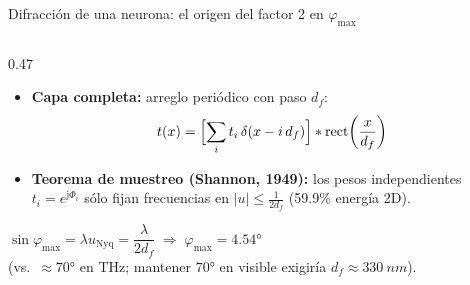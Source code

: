 \documentclass[aspectratio=169,10pt]{beamer}
\newcommand{\jj}{\mathrm{j}}
\newcommand{\rect}{\operatorname{rect}}
\begin{document}
\begin{frame}{Difracción de una neurona: el origen del factor 2 en $\varphi_{\max}$}
\begin{columns}[T,onlytextwidth]
\begin{column}{0.47\textwidth}
\begin{itemize}
      \item \textbf{Capa completa:} arreglo periódico con paso $d_f$:
      \[
        t(x)=\Bigl[\sum_i t_i\,\delta(x-i\,d_f)\Bigr]*\rect\!\left(\frac{x}{d_f}\right)
      \]
      \item \textbf{Teorema de muestreo (Shannon, 1949):} los pesos independientes $t_i=e^{\jj\Phi_i}$ sólo fijan frecuencias en $|u|\le \frac{1}{2d_f}$ (59.9\% energía 2D).
    \end{itemize}
    \vspace{2pt}
    \begin{destacado}
      \centering\footnotesize
      $\sin\varphi_{\max}=\lambda u_{\text{Nyq}}=\dfrac{\lambda}{2d_f}
      \;\Longrightarrow\;\varphi_{\max}=\mathbf{\ang{4.54}}$\\[2pt]
      {\scriptsize(vs.\ $\approx\ang{70}$ en THz; mantener $\ang{70}$ en visible exigiría $d_f\approx\SI{330}{nm}$).}
    \end{destacado}
  \end{column}
\end{columns}
\end{frame}
\end{document}
